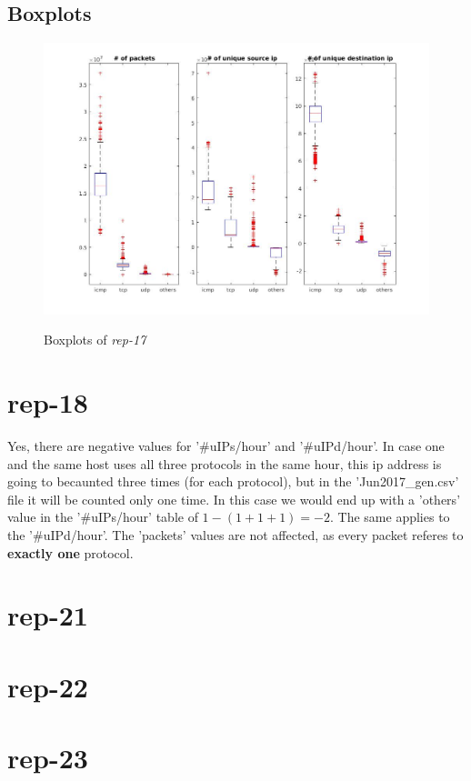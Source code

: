 \subsection*{Boxplots}
\begin{figure}[H]
\center
\includegraphics[width=.7\textwidth]{./chapters/plots/rep17.jpg}\\
\caption{Boxplots of \textit{rep-17}}
\end{figure}
\section*{rep-18}
Yes, there are negative values for '\#uIPs/hour' and '\#uIPd/hour'. In case one and the same host uses all three protocols in the same hour, this ip address is going to becaunted three times (for each protocol), but in the 'Jun2017\_gen.csv' file it will be counted only one time. In this case we would end up with a 'others' value in the '\#uIPs/hour' table of $1 - (1+1+1) = -2$. The same applies to the '\#uIPd/hour'. The 'packets' values are not affected, as every packet referes to \textbf{exactly one} protocol.

\section*{rep-21}

\section*{rep-22}

\section*{rep-23}

